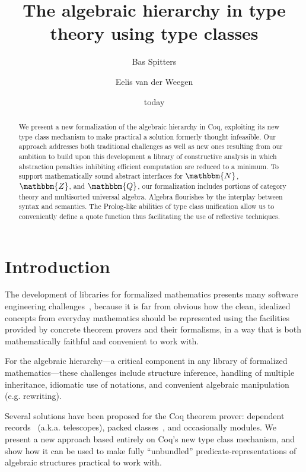 \documentclass[a4paper,10pt,runningheads]{llncs}
\newcommand{\N}{\ensuremath{\mathbbm{N}}}
\newcommand{\Z}{\ensuremath{\mathbbm{Z}}}
\newcommand{\Q}{\ensuremath{\mathbbm{Q}}}
\begin{document}
\title{The algebraic hierarchy in type theory using type classes}
\author{Bas Spitters \and Eelis van der Weegen} %
\date{today}
\maketitle
\begin{abstract}
We present a new formalization of the algebraic hierarchy in Coq, exploiting its new type class mechanism to make practical a solution formerly thought infeasible. Our approach addresses both traditional challenges as well as new ones resulting from our ambition to build upon this development a library of constructive analysis in which abstraction penalties inhibiting efficient computation are reduced to a minimum. To support mathematically sound abstract interfaces for $\N$, $\Z$, and $\Q$, our formalization includes portions of category theory and multisorted universal algebra.
Algebra flourishes by the interplay between syntax and semantics. The Prolog-like
abilities of type class unification allow us to conveniently define a quote function thus facilitating the use of reflective techniques.
\end{abstract}

\section{Introduction}
The development of libraries for formalized mathematics presents many software engineering challenges~\cite{C-corn,DBLP:conf/types/HaftmannW08}, because it is far from obvious how the clean, idealized concepts from everyday mathematics should be represented using the facilities provided by concrete theorem provers and their formalisms, in a way that is both mathematically faithful and convenient to work with.

For the algebraic hierarchy---a critical component in any library of formalized mathematics---these challenges include structure inference, handling of multiple inheritance, idiomatic use of notations, and convenient algebraic manipulation (e.g. rewriting).

Several solutions have been proposed for the Coq theorem prover: dependent records~\cite{DBLP:journals/jsc/GeuversPWZ02} (a.k.a. telescopes), packed classes~\cite{Packed}, and occasionally modules. We present a new approach based entirely on Coq's new type class mechanism, and show how it can be used to make fully ``unbundled'' predicate-representations of algebraic structures practical to work with.
\end{document}
